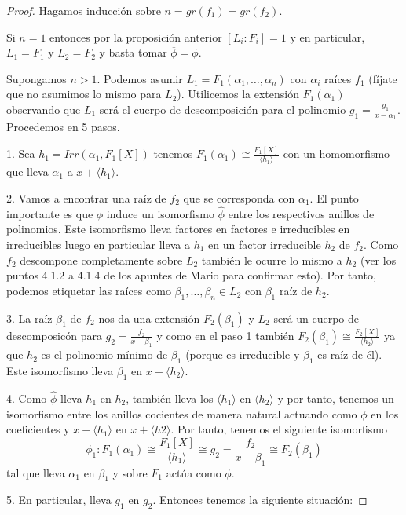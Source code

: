 \begin{proof}
	Hagamos inducción sobre $n = gr(f_1) = gr(f_2)$. 
	
	Si $n = 1$ entonces por la proposición anterior $[L_i:F_i] = 1$ y en particular, $L_1 = F_1$ y $L_2 = F_2$ y basta tomar $\overline{\phi} = \phi$. 
	
	Supongamos $n > 1$. Podemos asumir $L_1 = F_1(\alpha_1,\ldots,\alpha_n)$ con $\alpha_i$ raíces $f_1$ (fíjate que no asumimos lo mismo para $L_2$). Utilicemos la extensión $F_1(\alpha_1)$ observando  que $L_1$ será el cuerpo de descomposición para el polinomio $g_1 = \frac{g_1}{x- \alpha_1}$. Procedemos en 5 pasos. 
	
	1. Sea $h_1 = Irr(\alpha_1,F_1[X])$ tenemos $F_1(\alpha_1) \cong \frac{F_1[X]}{\langle h_1 \rangle}$ con un homomorfismo que lleva $\alpha_1$ a $x+\langle h_1 \rangle$.
	
	2. Vamos a encontrar una raíz de $f_2$ que se corresponda con $\alpha_1$. El punto importante es que $\phi$ induce un isomorfismo $\hat \phi$ entre los respectivos anillos de polinomios. Este isomorfismo lleva factores en factores e irreducibles en irreducibles luego en particular lleva a $h_1$ en un factor irreducible $h_2$ de $f_2$. Como $f_2$ descompone completamente sobre $L_2$ también le ocurre lo mismo a $h_2$ (ver los puntos 4.1.2 a 4.1.4 de los apuntes de Mario para confirmar esto). Por tanto, podemos etiquetar las raíces como $\beta_1,\ldots,\beta_n \in L_2$ con $\beta_1$ raíz de $h_2$. 
	
	3. La raíz $\beta_1$ de $f_2$ nos da una extensión $F_2(\beta_1)$ y $L_2$ será un cuerpo de descomposicón para $g_2 = \frac{f_2}{x- \beta_1}$ y como en el paso 1 también $F_2(\beta_1) \cong \frac{F_2[X]}{\langle h_2 \rangle}$ ya que $h_2$ es el polinomio mínimo de $\beta_1$ (porque es irreducible y $\beta_1$ es raíz de él). Este isomorfismo lleva $\beta_1$ en $x+\langle h_2 \rangle$. 
	
	4. Como $\hat \phi$ lleva $h_1$ en $h_2$, también lleva los $\langle h_1 \rangle$ en $\langle h_2 \rangle$ y por tanto, tenemos un isomorfismo entre los anillos cocientes de manera natural actuando como $\phi$ en los coeficientes y $x+\langle h_1 \rangle$ en $x + \langle h2 \rangle$. Por tanto, tenemos el siguiente isomorfismo $$\phi_1:F_1(\alpha_1) \cong \frac{F_1[X]}{\langle h_1 \rangle} \cong g_2 = \frac{f_2}{x- \beta_1} \cong F_2(\beta_1)$$ tal que lleva $\alpha_1$ en $\beta_1$ y sobre $F_1$ actúa como $\phi$.

	5. En particular, lleva $g_1$ en $g_2$. Entonces tenemos la siguiente situación:
	

\end{proof}
